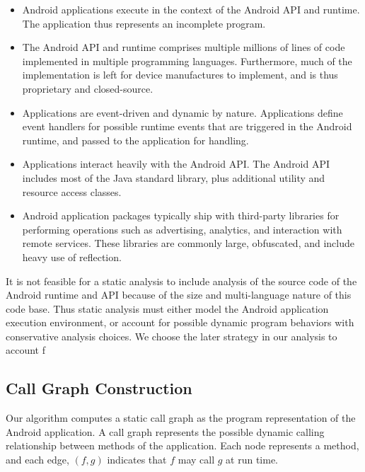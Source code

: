 \begin{itemize}

\item Android applications execute in the context of the Android API
  and runtime.  The application thus represents an incomplete program.
  
\item The Android API and runtime comprises multiple millions of lines of
  code implemented in multiple programming languages.  Furthermore,
  much of the implementation is left for device manufactures to
  implement, and is thus proprietary and closed-source. 

\item Applications are event-driven and dynamic by nature.
  Applications define event handlers for possible runtime events that
  are triggered in the Android runtime, and passed to the application
  for handling. 

\item Applications interact heavily with the Android API.  The Android
  API includes most of the Java standard library, plus additional
  utility and resource access classes.

\item Android application packages typically ship with third-party
  libraries for performing operations such as advertising, analytics,
  and interaction with remote services.  These libraries are commonly
  large, obfuscated, and include heavy use of reflection.

\end{itemize}

It is not feasible for a static analysis to include analysis of the
source code of the Android runtime and API because of the size and
multi-language nature of this code base.  Thus static analysis must
either model the Android application execution environment, or account
for possible dynamic program behaviors with conservative analysis
choices.  We choose the later strategy in our analysis to account f

\subsection{Call Graph Construction}

Our algorithm computes a static call graph as the program
representation of the Android application.  A call graph represents
the possible dynamic calling relationship between methods of the
application.  Each node represents a method, and each edge, $(f,g)$
indicates that $f$ may call $g$ at run time.  

